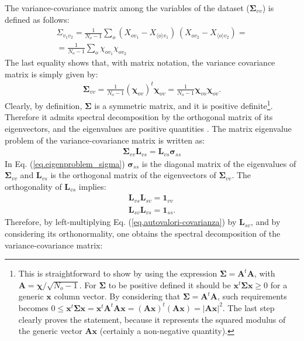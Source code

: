 \documentclass[11pt]{amsart}
\begin{document}
%
The variance-covariance matrix among the variables of the dataset ($\bm \Sigma_{vv}$) is defined as follows:
%
\begin{eqnarray}
\label{eq.variance_covariance}
\Sigma_{v_1 v_2} = 
\frac{1}{N_o-1} 
\sum_{o} 
\left( X_{o v_1} - X_{\langle o \rangle v_1} \right) 
\, 
\left( X_{o v_2} - X_{\langle o \rangle v_2} \right) 
=
\\ \nonumber
=
\frac{1}{N_o-1} 
\sum_{o}
\chi_{o v_1} \chi_{o v_2}
\end{eqnarray}
%
The last equality shows that, with matrix notation, the variance covariance matrix is simply given by:
%
\begin{eqnarray}
\label{eq.variance_covariance}
\bm \Sigma_{vv} = 
\frac{1}{N_o-1} 
({\bm \chi_{ov}})^t {\bm \chi_{ov}} = \frac{1}{N_o-1} 
{\bm \chi_{vo}} {\bm \chi_{ov}}.
\end{eqnarray}
%
Clearly, by definition, $\bm \Sigma$ is a symmetric matrix, and it is positive definite\footnote{This is straightforward to show by using the expression $\bm \Sigma = \bm A^t \bm A$, with $\bm A = \bm \chi / \sqrt{N_o-1}$. For $\bm \Sigma$ to be positive defined it should be $\bm x^t \bm \Sigma \bm x \ge 0$ for a generic $\bm x$ column vector.
%
By considering that $\bm \Sigma = \bm A^t \bm A$, such requirements becomes $0 \le \bm x^t \bm \Sigma \bm x = \bm x^t \bm A^t \bm A \bm x = (\bm A \bm x)^t (\bm A \bm x) = \left| \bm A \bm x \right|^2$. The last step clearly proves the statement, because it represents the squared modulus of the generic vector $\bm A \bm x$ (certainly a non-negative quantity).}. Therefore it admits spectral decomposition by the orthogonal matrix of its eigenvectors, and the eigenvalues are positive quantities \cite{Schott2016}.
%
The matrix eigenvalue problem of the variance-covariance matrix is written as:
%
\begin{eqnarray}
\label{eq.eigenproblem_sigma}
\bm \Sigma_{vv} \bm L_{vs} = \bm L_{vs} \bm \sigma_{ss} 
\end{eqnarray}
%
In Eq. (\ref{eq.eigenproblem_sigma}) $\bm \sigma_{ss}$ is the diagonal matrix of the eigenvalues of $\bm \Sigma_{vv}$ and $\bm L_{vs}$ is the orthogonal matrix of the eigenvectors of $\bm \Sigma_{vv}$. The orthogonality of $\bm L_{vs}$ implies:
%
\begin{eqnarray}
\bm L_{vs} \bm L_{sv}  = \bm 1_{vv}
\\ \nonumber
\bm L_{sv} \bm L_{vs}  = \bm 1_{ss}. 
\end{eqnarray}
%
Therefore, by left-multiplying Eq. (\ref{eq.autovalori-covarianza}) by $\bm L_{sv}$, and by considering its orthonormality, one obtains the spectral decomposition of the variance-covariance matrix:
\end{document}
